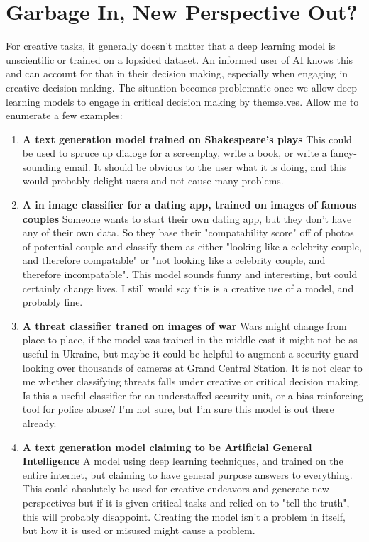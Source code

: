 \section{Garbage In, New Perspective Out?}

For creative tasks, it generally doesn't matter that a deep learning model is unscientific or trained on a lopsided dataset. An informed user of AI knows this and can account for that in their decision making, especially when engaging in creative decision making. The situation becomes problematic once we allow deep learning models to engage in critical decision making by themselves. Allow me to enumerate a few examples:

\begin{enumerate}
    \item \textbf{A text generation model trained on Shakespeare's plays} This could be used to spruce up dialoge for a screenplay, write a book, or write a fancy-sounding email. It should be obvious to the user what it is doing, and this would probably delight users and not cause many problems.
    \item \textbf{A in image classifier for a dating app, trained on images of famous couples} Someone wants to start their own dating app, but they don't have any of their own data. So they base their "compatability score" off of photos of potential couple and classify them as either "looking like a celebrity couple, and therefore compatable" or "not looking like a celebrity couple, and therefore incompatable". This model sounds funny and interesting, but could certainly change lives. I still would say this is a creative use of a model, and probably fine. 
    \item \textbf{A threat classifier traned on images of war} Wars might change from place to place, if the model was trained in the middle east it might not be as useful in Ukraine, but maybe it could be helpful to augment a security guard looking over thousands of cameras at Grand Central Station. It is not clear to me whether classifying threats falls under creative or critical decision making. Is this a useful classifier for an understaffed security unit, or a bias-reinforcing tool for police abuse? I'm not sure, but I'm sure this model is out there already.
    \item \textbf{A text generation model claiming to be Artificial General Intelligence} A model using deep learning techniques, and trained on the entire internet, but claiming to have general purpose answers to everything. This could absolutely be used for creative endeavors and generate new perspectives but if it is given critical tasks and relied on to "tell the truth", this will probably disappoint. Creating the model isn't a problem in itself, but how it is used or misused might cause a problem.

\end{enumerate}
